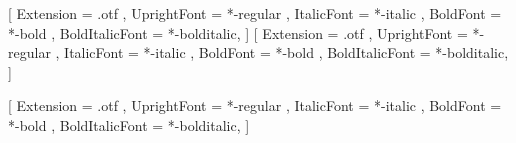 \usepackage[
    linecolor=myyellow,
    backgroundcolor=myyellow,
]{todonotes}



\usepackage{fontspec} %
\setmainfont{texgyrepagella}[
Extension = .otf ,
UprightFont = *-regular ,
ItalicFont = *-italic ,
BoldFont = *-bold ,
BoldItalicFont = *-bolditalic,
]
\setsansfont{texgyreheros}[
Extension = .otf ,
UprightFont = *-regular ,
ItalicFont = *-italic ,
BoldFont = *-bold ,
BoldItalicFont = *-bolditalic,
]
\usepackage{unicode-math}
\setmonofont{texgyrecursor}[
Extension = .otf ,
UprightFont = *-regular ,
ItalicFont = *-italic ,
BoldFont = *-bold ,
BoldItalicFont = *-bolditalic,
]




